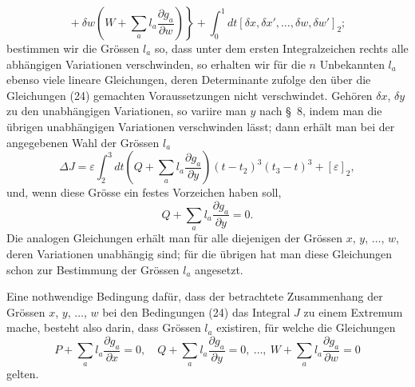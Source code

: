 \documentclass[11pt,a4paper,leqno]{article}
\begin{document}
\[
\left.{}+\delta w\left(W+\sum_a l_a\frac{\partial g_a}{\partial w}\right)\right\}+\int_0^1dt[\delta x,\delta x',\ldots,\delta w,\delta w']_2;
\]
bestimmen wir die Grössen $l_a$ so, dass unter dem ersten Integralzeichen rechts alle abhängigen Variationen verschwinden, so erhalten wir für die $n$ Unbekannten $l_a$ ebenso viele lineare Gleichungen, deren Determinante zufolge den über die Gleichungen (24) gemachten Voraussetzungen nicht verschwindet. Gehören $\delta x$, $\delta y$ zu den unabhängigen Variationen, so variire man $y$ nach \S~8, indem man die übrigen unabhängigen Variationen verschwinden lässt; dann erhält man bei der angegebenen Wahl der Grössen $l_a$
\[
\Delta J=\varepsilon\int_2^3 dt\left(Q+\sum_a l_a\frac{\partial g_a}{\partial y}\right)(t-t_2)^3(t_3-t)^3+[\varepsilon]_2,
\]
und, wenn diese Grösse ein festes Vorzeichen haben soll,
\[
Q+\sum_a l_a\frac{\partial g_a}{\partial y}=0.
\]
Die analogen Gleichungen erhält man für alle diejenigen der Grössen $x$, $y$, $\ldots$, $w$, deren Variationen unabhängig sind; für die übrigen hat man diese Gleichungen schon zur Bestimmung der Grössen $l_a$ angesetzt.

Eine nothwendige Bedingung dafür, dass der betrachtete Zusammenhang der Grössen $x$, $y$, $\ldots$, $w$ bei den Bedingungen (24) das Integral $J$ zu einem Extremum mache, besteht also darin, dass Grössen $l_a$ existiren, für welche die Gleichungen
\[
P+\sum_a l_a\frac{\partial g_a}{\partial x}=0,\quad Q+\sum_a l_a\frac{\partial g_a}{\partial y}=0,\ \ldots,\ W+\sum_a l_a\frac{\partial g_a}{\partial w}=0
\]
gelten.
\end{document}

